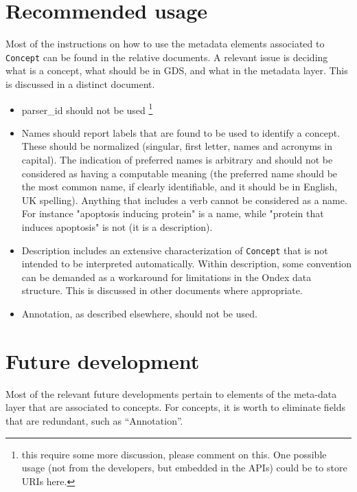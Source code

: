 \documentclass[a4paper,10pt]{article}
\newcommand{\term}[1]{\texttt{#1}\xspace}
\newcommand{\co}{\term{Concept}}
\begin{document}
\section{Recommended usage}
Most of the instructions on how to use the metadata elements associated to \co can be found in the relative documents. A relevant issue is deciding what is a concept, what should be in GDS, and what in the metadata layer. This is discussed in a distinct document.
\begin{itemize}
\item {parser\_id } should not be used \footnote{this require some more discussion, please comment on this. One possible usage (not from the developers, but embedded in the APIs) could be to store URIs here.}
\item{Names} should report labels that are found to be used to identify a concept. These should be normalized (singular, first letter, names and acronyms in capital). The indication of preferred names is arbitrary and should not be considered as having a computable meaning (the preferred name should be the most common name, if clearly identifiable, and it should be in English, UK spelling). Anything that includes a verb cannot be considered as a name. For instance "apoptosis inducing protein" is a name, while "protein that induces apoptosis" is not (it is a description).
\item{Description includes an extensive characterization of \co that is not intended to be interpreted automatically. Within description, some convention can be demanded as a workaround for limitations in the Ondex data structure. This is discussed in other documents where appropriate.}
\item{Annotation, as described elsewhere, should not be used.}
\end{itemize}
\section{Future development}



Most of the relevant future developments pertain to elements of the meta-data layer that are associated to concepts. For concepts, it is worth to eliminate fields that are redundant, such as ``Annotation''.
\end{document}
